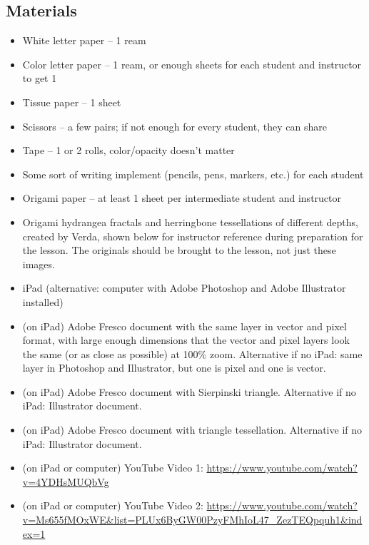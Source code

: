 \documentclass{lessonplan}
\begin{document}
    \subsection{Materials}
      \begin{itemize}
        \item White letter paper -- 1 ream
        \item Color letter paper -- 1 ream, or enough sheets for each student and instructor to get 1
        \item Tissue paper -- 1 sheet
        \item Scissors -- a few pairs; if not enough for every student, they can share
        \item Tape -- 1 or 2 rolls, color/opacity doesn't matter
        \item Some sort of writing implement (pencils, pens, markers, etc.) for each student
        \item Origami paper -- at least 1 sheet per intermediate student and instructor
        \item Origami hydrangea fractals and herringbone tessellations of different depths, created by Verda, shown 
          below for instructor reference during preparation for the lesson. The originals should be brought to the 
          lesson, not just these images.
        \item iPad (alternative: computer with Adobe Photoshop and Adobe Illustrator installed)
        \item (on iPad) Adobe Fresco document with the same layer in vector and pixel format, with large enough 
          dimensions that the vector and pixel layers look the same (or as close as possible) at 100\% zoom.
          Alternative if no iPad: same layer in Photoshop and Illustrator, but one is pixel and one is vector.
        \item (on iPad) Adobe Fresco document with Sierpinski triangle. Alternative if no iPad: Illustrator document.
        \item (on iPad) Adobe Fresco document with triangle tessellation. Alternative if no iPad: Illustrator document.
        \item (on iPad or computer) YouTube Video 1: 
          \url{https://www.youtube.com/watch?v=4YDHsMUQbVg}
        \item (on iPad or computer) YouTube Video 2: 
          \url{https://www.youtube.com/watch?v=Ms655fMOxWE&list=PLUx6ByGW00PzyFMhIoL47_ZezTEQpquh1&index=1}

\end{itemize}
\end{document}
